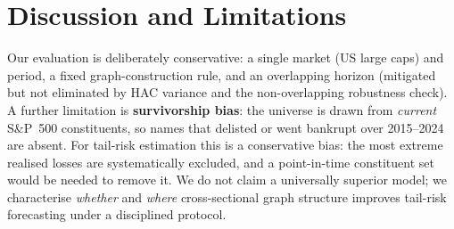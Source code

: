 \documentclass{llncs}
\begin{document}
\section{Discussion and Limitations}
Our evaluation is deliberately conservative: a single market (US large caps) and
period, a fixed graph-construction rule, and an overlapping horizon (mitigated
but not eliminated by HAC variance and the non-overlapping robustness check). A
further limitation is \textbf{survivorship bias}: the universe is drawn from
\emph{current} S\&P~500 constituents, so names that delisted or went bankrupt over
2015--2024 are absent. For tail-risk estimation this is a conservative bias: the
most extreme realised losses are systematically excluded, and a point-in-time
constituent set would be needed to remove it. We do not claim a universally
superior model; we characterise \emph{whether} and \emph{where} cross-sectional
graph structure improves tail-risk forecasting under a disciplined protocol.
\end{document}
